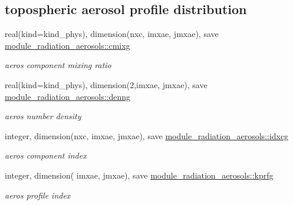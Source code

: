 \subsection*{topospheric aerosol profile distribution}
\begin{DoxyCompactItemize}
\item 
\mbox{\label{group__module__radiation__aerosols_ga358c83599fb321a59c958e54d9f284d9}} 
real(kind=kind\+\_\+phys), dimension(nxc, imxae, jmxae), save \hyperlink{group__module__radiation__aerosols_ga358c83599fb321a59c958e54d9f284d9}{module\+\_\+radiation\+\_\+aerosols\+::cmixg}
\begin{DoxyCompactList}\small\item\em aeros component mixing ratio \end{DoxyCompactList}\item 
\mbox{\label{group__module__radiation__aerosols_ga0ccc698bc870cb6ccbc1c2b64a3f45f6}} 
real(kind=kind\+\_\+phys), dimension(2,imxae, jmxae), save \hyperlink{group__module__radiation__aerosols_ga0ccc698bc870cb6ccbc1c2b64a3f45f6}{module\+\_\+radiation\+\_\+aerosols\+::denng}
\begin{DoxyCompactList}\small\item\em aeros number density \end{DoxyCompactList}\item 
\mbox{\label{group__module__radiation__aerosols_ga4cb38abaf6ece5a0ed717edd6f6b4078}} 
integer, dimension(nxc, imxae, jmxae), save \hyperlink{group__module__radiation__aerosols_ga4cb38abaf6ece5a0ed717edd6f6b4078}{module\+\_\+radiation\+\_\+aerosols\+::idxcg}
\begin{DoxyCompactList}\small\item\em aeros component index \end{DoxyCompactList}\item 
\mbox{\label{group__module__radiation__aerosols_ga28df10ba381278cc7474bea0bfdaa870}} 
integer, dimension( imxae, jmxae), save \hyperlink{group__module__radiation__aerosols_ga28df10ba381278cc7474bea0bfdaa870}{module\+\_\+radiation\+\_\+aerosols\+::kprfg}
\begin{DoxyCompactList}\small\item\em aeros profile index \end{DoxyCompactList}\end{DoxyCompactItemize}
